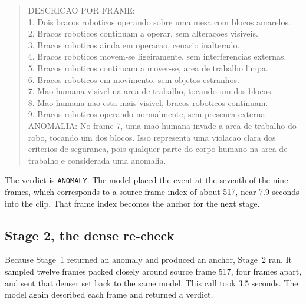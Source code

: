 \begin{quote}\small\ttfamily
DESCRICAO POR FRAME:\\
1. Dois bracos roboticos operando sobre uma mesa com blocos amarelos.\\
2. Bracos roboticos continuam a operar, sem alteracoes visiveis.\\
3. Bracos roboticos ainda em operacao, cenario inalterado.\\
4. Bracos roboticos movem-se ligeiramente, sem interferencias externas.\\
5. Bracos roboticos continuam a mover-se, area de trabalho limpa.\\
6. Bracos roboticos em movimento, sem objetos estranhos.\\
7. Mao humana visivel na area de trabalho, tocando um dos blocos.\\
8. Mao humana nao esta mais visivel, bracos roboticos continuam.\\
9. Bracos roboticos operando normalmente, sem presenca externa.\\[4pt]
ANOMALIA: No frame 7, uma mao humana invade a area de trabalho do robo,
tocando um dos blocos. Isso representa uma violacao clara dos criterios
de seguranca, pois qualquer parte do corpo humano na area de trabalho e
considerada uma anomalia.
\end{quote}

The verdict is \texttt{ANOMALY}. The model placed the event at the
seventh of the nine frames, which corresponds to a source frame index of
about 517, near 7.9 seconds into the clip. That frame index becomes the
anchor for the next stage.

\subsection{Stage 2, the dense re-check} 

Because Stage~1 returned an anomaly and produced an anchor, Stage~2 ran.
It sampled twelve frames packed closely around source frame 517, four
frames apart, and sent that denser set back to the same model. This call
took 3.5 seconds. The model again described each frame and returned a
verdict.

